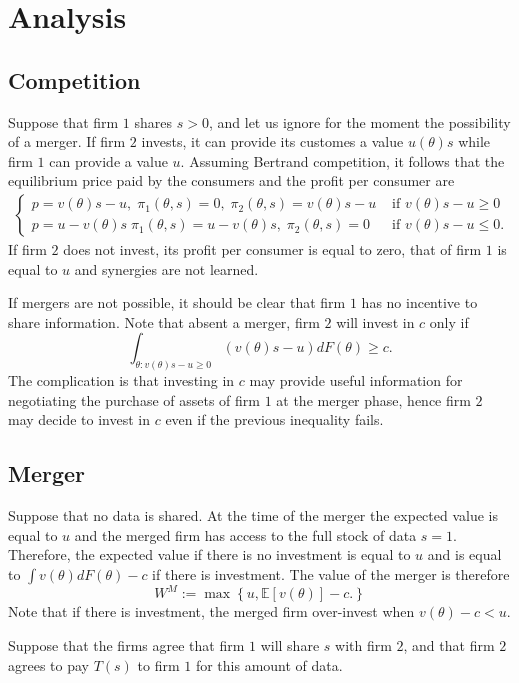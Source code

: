 \documentclass[a4paper,leqno]{article}%
\newcommand{\E}{\mathbb E}
\renewcommand{\t}{\theta}
\begin{document}
\section{Analysis}
\subsection{Competition}
Suppose that firm $1$ shares $s>0$, and let us ignore for the moment the possibility of a merger. If firm $2$ invests, it can provide its customes a value $u(\t)s$ while firm $1$ can provide a value $u$. Assuming Bertrand competition, it follows that the equilibrium price paid by the consumers and the profit per consumer are
\begin{align}\label{comp}
\begin{cases}
    p=v(\t)s-u,\; \pi_1(\t,s)=0,\; \pi_2(\t,s)=v(\t)s-u & \text{ if }v(\t)s-u\geq 0\\ 
    p=u-v(\t)s\; \pi_1(\t,s)=u-v(\t)s,\; \pi_2(\t,s)=0 & \text{ if }v(\t)s-u\leq 0.
\end{cases}
\end{align}
If firm $2$ does not invest, its profit per consumer is equal to zero, that of firm $1$ is equal to $u$ and synergies are not learned.

If mergers are not possible, it should be clear that firm $1$ has no incentive to share information. Note that absent a merger, firm $2$ will invest in $c$ only if 
%
\[
\int_{\t:v(\t)s-u\geq 0}(v(\t)s-u) dF(\t)\geq c.
\]
The complication is that investing in $c$ may provide useful information for negotiating the purchase of assets of firm $1$ at the merger phase, hence firm $2$ may decide to invest in $c$ even if the previous inequality fails.

\subsection{Merger}
%
Suppose that no data is shared. At the time of the merger the expected value is equal to $u$ and the merged firm has access to the full stock of data $s=1$. Therefore, the expected value if there is no investment is equal to $u$ and is equal to $\int v(\t)dF(\t)-c$ if there is investment. The value of the merger is therefore
%
\[
W^M:=\max\left\{u,\E[v(\t)]-c.\right\}
\]
%
Note that if there is investment, the merged firm over-invest when $v(\t)-c<u$.

Suppose that the firms agree that firm $1$ will share $s$ with firm $2$, and that firm $2$ agrees to pay $T(s)$ to firm $1$ for this amount of data. 
\end{document}
